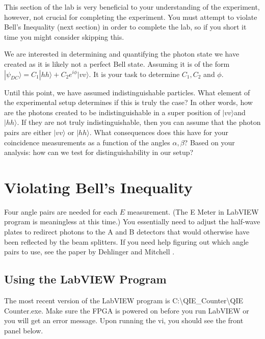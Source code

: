 \documentclass{../lab}
\begin{document}
This section of the lab is very beneficial to your understanding of the experiment, however, not crucial for completing the experiment. You must attempt to violate Bell's Inequality (next section) in order to complete the lab, so if you short it time you might consider skipping this.

We are interested in determining and quantifying the photon state we have created as it is likely not a perfect Bell state. Assuming it is of the form $|\psi_{DC}\rangle = C_1 |hh\rangle + C_2 e^{i\phi}|vv\rangle$. It is your task to determine $C_1, C_2$ and $\phi$.


Until this point, we have assumed indistinguishable particles. What element of the experimental setup determines if this is truly the case? In other words, how are the photons created to be indistinguishable in a super position of $|vv\rangle$and $|hh\rangle$. If they are not truly indistinguishable, then you can assume that the photon pairs are either $|vv\rangle$ or $|hh\rangle$. What consequences does this have for your coincidence measurements as a function of the angles $\alpha, \beta$? Based on your analysis: how can we test for distinguishability in our setup?

\section{Violating Bell's Inequality}

Four angle pairs are needed for each $E$ measurement. (The E Meter in LabVIEW program is meaningless at this time.) You essentially need to adjust the half-wave plates to redirect photons to the A and B detectors that would otherwise have been reflected by the beam splitters. If you need help figuring out which angle pairs to use, see the paper by Dehlinger and Mitchell \cite{Dehlinger}.

\subsection{Using the LabVIEW Program}
\label{subsec:UsingLabVIEWProgram}

The most recent version of the LabVIEW program is C:\textbackslash QIE\_Counter\textbackslash QIE Counter.exe. Make sure the FPGA is powered on before you run LabVIEW or you will get an error message. Upon running the vi, you should see the front panel below.
\end{document}

